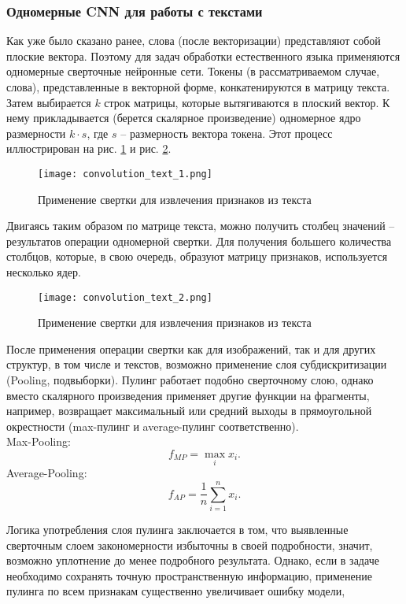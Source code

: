 \subsubsection{Одномерные CNN для работы с текстами}
Как уже было сказано ранее, слова (после векторизации) представляют собой плоские вектора. Поэтому для задач обработки естественного 
языка применяются одномерные сверточные нейронные сети. Токены (в рассматриваемом случае, слова), представленные в векторной форме,
конкатенируются в матрицу текста.
Затем выбирается $k$ строк матрицы, которые вытягиваются в плоский вектор. К нему прикладывается (берется скалярное произведение) 
одномерное ядро размерности $k \cdot s$, где $s$ -- размерность вектора токена. Этот процесс иллюстрирован на рис. \ref{fig:cnn31} 
и рис. \ref{fig:cnn32}. 
\begin{figure}[H]
    \centering
    \texttt{[image: convolution\_text\_1.png]}
    \caption{Применение свертки для извлечения признаков из текста}
    \label{fig:cnn31}
\end{figure}
Двигаясь таким образом по матрице текста, можно получить столбец значений – результатов операции одномерной свертки. 
Для получения большего количества столбцов, которые, в свою очередь, образуют матрицу признаков, используется несколько ядер.
\begin{figure}[H]
    \centering
    \texttt{[image: convolution\_text\_2.png]}
    \caption{Применение свертки для извлечения признаков из текста}
    \label{fig:cnn32}
\end{figure}
После применения операции свертки как для изображений, так и для других структур, в том числе и текстов,
 возможно применение слоя субдискритизации (Pooling, подвыборки). Пулинг работает подобно сверточному слою, 
 однако вместо скалярного произведения применяет другие функции на фрагменты, 
 например, возвращает максимальный или средний выходы в прямоугольной окрестности
  (max-пулинг \cite{Zhou:1} и average-пулинг соответственно). \\Max-Pooling:
  \[f_{MP} = \max\limits_{i} x_{i}.\] 
  Average-Pooling:
  \[f_{AP} = \frac{1}{n} \sum\limits_{i=1}^{n}x_{i}.\]
  \bigskip\par
  Логика употребления слоя пулинга заключается в том, что выявленные сверточным слоем закономерности избыточны 
  в своей подробности, значит, возможно уплотнение до менее подробного результата. Однако, если в задаче необходимо 
  сохранять точную пространственную информацию, применение пулинга по всем признакам существенно увеличивает ошибку модели,
